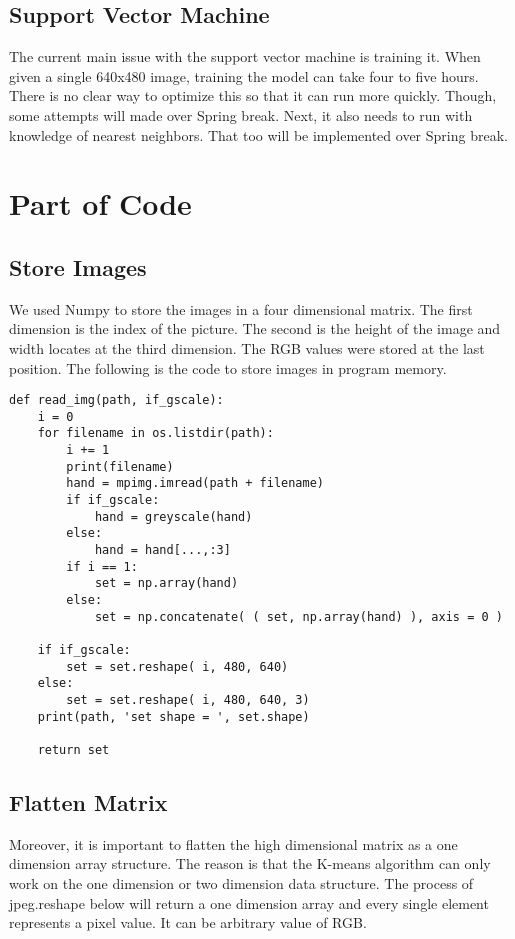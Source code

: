\documentclass[10pt,journal,compsoc, draftclsnofoot,onecolumn]{IEEEtran}
\begin{document}
\subsection{Support Vector Machine}
The current main issue with the support vector machine is training it.
When given a single 640x480 image, training the model can take four to five hours.
There is no clear way to optimize this so that it can run more quickly.
Though, some attempts will made over Spring break.
Next, it also needs to run with knowledge of nearest neighbors.
That too will be implemented over Spring break.

\section{Part of Code}
\subsection{Store Images}
We used Numpy to store the images in a four dimensional matrix. The first dimension is the index of the picture. The second is the height of the image and width locates at the third dimension. The RGB values were stored at the last position. The following is the code to store images in program memory.

\begin{lstlisting}
def read_img(path, if_gscale):
    i = 0
    for filename in os.listdir(path):
        i += 1
        print(filename)
        hand = mpimg.imread(path + filename)
        if if_gscale:
            hand = greyscale(hand)
        else:
            hand = hand[...,:3]
        if i == 1:
            set = np.array(hand)
        else:  
            set = np.concatenate( ( set, np.array(hand) ), axis = 0 )

    if if_gscale:
        set = set.reshape( i, 480, 640)
    else:
        set = set.reshape( i, 480, 640, 3)
    print(path, 'set shape = ', set.shape)

    return set
\end{lstlisting}

\subsection{Flatten Matrix}
Moreover, it is important to flatten the high dimensional matrix as a one dimension array structure. The reason is that the K-means algorithm can only work on the one dimension or two dimension data structure. The process of jpeg.reshape below will return a one dimension array and every single element represents a pixel value. It can be arbitrary value of RGB. 
\end{document}

